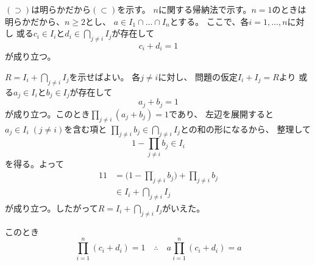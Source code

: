 \documentclass[report]{jlreq}
\begin{document}

\begin{answer}
    $(\supset)$は明らかだから$(\subset)$を示す。
    $n$に関する帰納法で示す。$n = 1$のときは明らかだから、$n \ge 2$とし、
    $a \in I_1 \cap \dots \cap I_n$とする。
    ここで、各$i = 1, \dots, n$に対し
    或る$c_i \in I_i$と$d_i \in \bigcap_{j \neq i} I_j$が存在して
    \begin{equation}
        c_i + d_i = 1
    \end{equation}
    が成り立つ。
    \begin{innerproof}
        $R = I_i + \bigcap_{j \neq i} I_j$を示せばよい。
        各$j \neq i$に対し、
        問題の仮定$I_i + I_j = R$より
        或る$a_j \in I_i$と$b_j \in I_j$が存在して
        \begin{equation}
            a_j + b_j = 1
        \end{equation}
        が成り立つ。このとき$\prod_{j \neq i} (a_j + b_j) = 1$であり、
        左辺を展開すると$a_j \in I_i \; (j \neq i)$を含む項と
        $\prod_{j \neq i} b_j \in \bigcap_{j \neq i} I_j$との和の形になるから、
        整理して
        \begin{equation}
            1 - \prod_{j \neq i} b_j \in I_i
        \end{equation}
        を得る。よって
        \begin{alignat}{1}
            1 &= \bigg( 1 - \prod_{j \neq i} b_j \bigg) + \prod_{j \neq i} b_j \\
                &\in I_i + \bigcap_{j \neq i} I_j
        \end{alignat}
        が成り立つ。したがって$R = I_i + \bigcap_{j \neq i} I_j$がいえた。
    \end{innerproof}
    このとき
    \begin{equation}
        \prod_{i = 1}^n (c_i + d_i) = 1
        \quad \therefore \quad
        a \prod_{i = 1}^n (c_i + d_i) = a
    \end{equation}

\end{answer}
\end{document}
